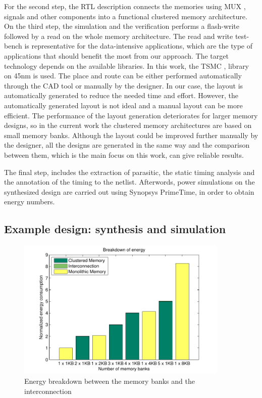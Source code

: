 For the second step, the RTL description connects the memories using MUX , signals and other components into a functional clustered memory architecture. 
On the third step, the simulation and the verification performs a flash-write followed by a read on the whole memory architecture. 
The read and write test-bench is representative for the data-intensive applications, which are the type of applications that should benefit the most from our approach. 
The target technology depends on the available libraries.
In this work, the TSMC , library on 45nm is used.
The place and route can be either performed automatically through the CAD tool or manually by the designer.
In our case, the layout is automatically generated to reduce the needed time and effort. 
However, the automatically generated layout is not ideal and a manual layout can be more efficient.
The performance of the layout generation deteriorates for larger memory designs, so in the current work the clustered memory architectures are based on small memory banks.
Although the layout could be improved further manually by the designer, all the designs are generated in the same way and the comparison between them, which is the main focus on this work, can give reliable results.


The final step, includes the extraction of  parasitic, the static timing analysis and the annotation of the timing to the netlist.
Afterwords, power simulations on the synthesized design are carried out using Synopsys PrimeTime, in order to obtain energy numbers.

\subsection{Example design: synthesis and simulation}

\begin{figure}
 \centering
 \includegraphics[width = 0.9\textwidth]{E/energy2.pdf}
  \caption{Energy breakdown between the memory banks and the interconnection}
 \label{fig:energyE}
 \end{figure}

